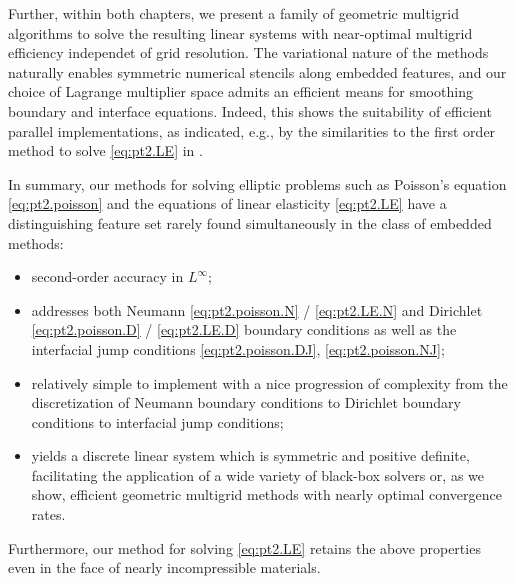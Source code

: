 Further, within both chapters, we present a family of geometric multigrid algorithms to solve the resulting linear systems with near-optimal multigrid efficiency independet of grid resolution. The variational nature of the methods naturally enables symmetric numerical stencils along embedded features, and our choice of Lagrange multiplier space admits an efficient means for smoothing boundary and interface equations. Indeed, this shows the suitability of efficient parallel implementations, as indicated, e.g., by the similarities to the first order method to solve \eqref{eq:pt2.LE} in \cite{Zhu.Yongning10}.

In summary, our methods for solving elliptic problems such as Poisson's equation \eqref{eq:pt2.poisson} and the equations of linear elasticity \eqref{eq:pt2.LE} have a distinguishing feature set rarely found simultaneously in the class of embedded methods:
\begin{itemize}
\item second-order accuracy in $L^{\infty}$;
\item addresses both Neumann \eqref{eq:pt2.poisson.N} / \eqref{eq:pt2.LE.N} and Dirichlet \eqref{eq:pt2.poisson.D} / \eqref{eq:pt2.LE.D} boundary conditions as well as the interfacial jump conditions \eqref{eq:pt2.poisson.DJ}, \eqref{eq:pt2.poisson.NJ};
\item relatively simple to implement with a nice progression of complexity from the discretization of Neumann boundary conditions to Dirichlet boundary conditions to interfacial jump conditions;
\item yields a discrete linear system which is symmetric and positive definite, facilitating the application of a wide variety of black-box solvers or, as we show, efficient geometric multigrid methods with nearly optimal convergence rates.
\end{itemize}
Furthermore, our method for solving \eqref{eq:pt2.LE} retains the above properties even in the face of nearly incompressible materials.
